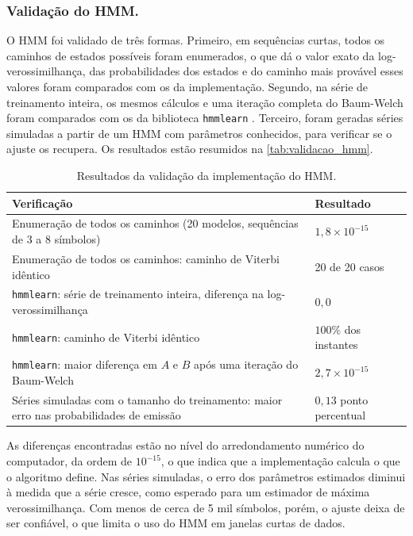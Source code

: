 \documentclass[
    12pt,                %
    openright,           %
    oneside,             %
    a4paper,             %
    english,             %
    brazil               %
]{abntex2}
\begin{document}
\subsubsection{Validação do HMM.} O HMM foi validado de três formas. Primeiro, em sequências curtas, todos os caminhos de estados possíveis foram enumerados, 
o que dá o valor exato da log-verossimilhança, das probabilidades dos estados e do caminho mais provável esses valores foram comparados com os da implementação. 
Segundo, na série de treinamento inteira, os mesmos cálculos e uma iteração completa do Baum-Welch foram comparados com os da 
biblioteca \texttt{hmmlearn} \cite{hmmlearn}. Terceiro, foram geradas séries simuladas a partir de um HMM com 
parâmetros conhecidos, para verificar se o ajuste os recupera. Os resultados estão resumidos na \autoref{tab:validacao_hmm}.

\begin{table}[htbp]
    \centering
    \caption{Resultados da validação da implementação do HMM.}
    \label{tab:validacao_hmm}
    \small
    \begin{tabular}{@{}p{}p{}@{}}
        \toprule
        \textbf{Verificação} & \textbf{Resultado} \\
        \midrule
        Enumeração de todos os caminhos (20 modelos, sequências de 3 a 8 símbolos) & $1{,}8 \times 10^{-15}$ \\
        Enumeração de todos os caminhos: caminho de Viterbi idêntico & 20 de 20 casos \\
        \texttt{hmmlearn}: série de treinamento inteira, diferença na log-verossimilhança & $0{,}0$ \\
        \texttt{hmmlearn}: caminho de Viterbi idêntico & $100\%$ dos instantes \\
        \texttt{hmmlearn}: maior diferença em $A$ e $B$ após uma iteração do Baum-Welch & $2{,}7 \times 10^{-15}$ \\
        Séries simuladas com o tamanho do treinamento: maior erro nas probabilidades de emissão & $0{,}13$ ponto percentual \\
        \bottomrule
    \end{tabular}
\end{table}

As diferenças encontradas estão no nível do arredondamento numérico do computador, da ordem de $10^{-15}$, o que indica que a implementação calcula o 
que o algoritmo define. Nas séries simuladas, o erro dos parâmetros estimados diminui à medida que a série cresce, como esperado para um 
estimador de máxima verossimilhança. Com menos de cerca de 5 mil símbolos, porém, o ajuste deixa de ser confiável, o que limita o uso do 
HMM em janelas curtas de dados.
\end{document}
